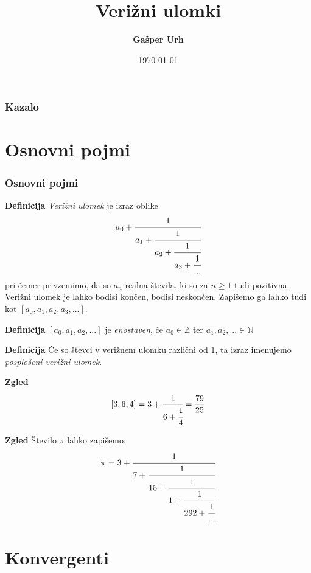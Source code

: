 \documentclass{beamer}
\title[Verižni ulomki]{Verižni ulomki}
\author[Gašper Urh]{\textbf {Gašper Urh}}
\institute[FMF UL]{\textbf {Fakulteta za matematiko in fiziko Univerze v Ljubljani}}
\date{\today}
\newcommand{\N}{\mathbb{N}}
\newcommand{\Z}{\mathbb{Z}}
\newenvironment{df}{\begin{block}{\textbf{Definicija}}}{\end{block}}
\newenvironment{zg}{\begin{block}{\textbf{Zgled}}}{\end{block}}
\begin{document}
\begin{frame}
\maketitle
\end{frame}

\begin{frame}
\frametitle{Kazalo}
\tableofcontents
\end{frame}

\section{Osnovni pojmi}

\begin{frame}
\frametitle{Osnovni pojmi}
	\begin{df}
	\textit{Verižni ulomek} je izraz oblike
	\[ a_0 + \cfrac{1}{a_1 + \cfrac{1}{a_2 + \cfrac{1}{a_3 + \cfrac{1}{...}}}} \]
	pri čemer privzemimo, da so $a_n$ realna števila, ki so za $n \geq 1$ tudi pozitivna. Verižni ulomek je lahko bodisi končen, bodisi neskončen.
	\newline
	\newline
	Zapišemo ga lahko tudi kot $[a_0, a_1, a_2, a_3, ...]$.
	\end{df}
\end{frame}

\begin{frame}
	\begin{df}
	$[a_0, a_1, a_2, ...]$ je \textit{enostaven}, če $a_0 \in \Z$ ter $a_1, a_2, ... \in \N$
	\end{df}
	\pause
	\begin{df}
	Če so števci v verižnem ulomku različni od 1, ta izraz imenujemo \textit{posplošeni verižni ulomek}.
	\end{df}
\end{frame}

\begin{frame}
	\begin{zg}
	\[ [3,6,4] = 3 + \cfrac{1}{6+\cfrac{1}{4}} = \frac{79}{25}\]
	\end{zg}
	\pause
	\begin{zg}
	Število $\pi$ lahko zapišemo: \[ \pi = 3 + \cfrac{1}{7 + \cfrac{1}{15 + \cfrac{1}{1 + \cfrac{1}{292 + \cfrac{1}{...}}}}} \]
	\end{zg}
\end{frame}

\section{Konvergenti}
\end{document}
